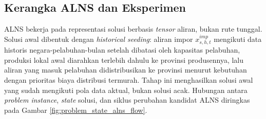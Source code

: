 \documentclass[journal]{IEEEtran}
\theoremstyle{definition}
\theoremstyle{definition}
\theoremstyle{plain}
\begin{document}
    \subsection{Kerangka ALNS dan Eksperimen}
    ALNS bekerja pada representasi solusi berbasis \textit{tensor} aliran, bukan rute tunggal. Solusi awal dibentuk dengan \textit{historical seeding}: aliran impor $x^{imp}_{s,h,t}$ mengikuti data historis negara-pelabuhan-bulan setelah dibatasi oleh kapasitas pelabuhan, produksi lokal awal diarahkan terlebih dahulu ke provinsi produsennya, lalu aliran yang masuk pelabuhan didistribusikan ke provinsi menurut kebutuhan dengan prioritas biaya distribusi termurah. Tahap ini menghasilkan solusi awal yang sudah mengikuti pola data aktual, bukan solusi acak. Hubungan antara \textit{problem instance}, \textit{state} solusi, dan siklus perubahan kandidat ALNS diringkas pada Gambar \ref{fig:problem_state_alns_flow}.
\end{document}
